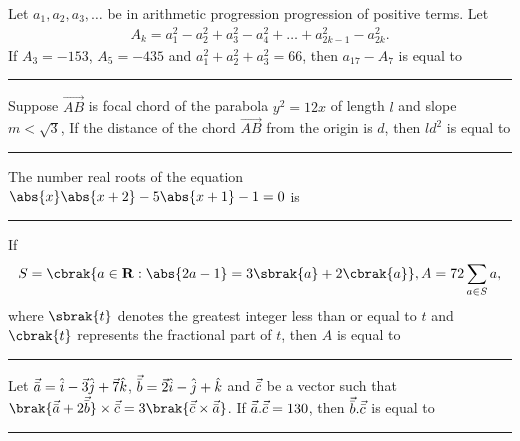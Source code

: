 \iffalse
\title{Assignment-4}
\author{EE24BTECH11049}
\section{integer}
\fi

%
    \item
    Let $a_1, a_2, a_3, \dots $ be in arithmetic progression progression of positive terms. Let
    \begin{align*}
        A_k = a_1^2 - a_2^2 + a_3^2 - a_4^2 + \dots + a_{2k-1}^2 -a_{2k}^2.
    \end{align*} 
    If $A_3 = -153$, $A_5 = -435$ and $a_1^2 + a_2^2 + a_3^2 = 66$, then $a_{17} - A_7$ is equal to \rule{1cm}{0.1pt}

    \hfill{}

    \item 
    Suppose $\vec{AB}$ is focal chord of the parabola $y^2 = 12x$ of length $l$ and slope $m < \sqrt{3}$, If the distance of the chord $\vec{AB}$ from the origin is $d$, then $ld^2$ is equal to \rule{1cm}{0.1pt}

    \hfill{}

    \item 
    The number real roots of the equation $\abs{x}\abs{x + 2} -  5\abs{x + 1} - 1 = 0$ is \rule{1cm}{0.1pt}

    \hfill{}

    \item 
    If 
    \begin{align*}
        S = \cbrak{a \in \mathbf{R} : \abs{2a - 1} = 3\sbrak{a} + 2\cbrak{a}}, A = 72\sum_{a \in S}a, 
    \end{align*}
    where $\sbrak{t}$ denotes the greatest integer less than or equal to $t$ and $\cbrak{t}$ represents the fractional part of $t$, then $A$ is equal to \rule{1cm}{0.1pt}

    \hfill{}

    \item 
    Let $\vec{\Bar{a}} = \hat{i} - \vec{3}\hat{j} + \vec{7}\hat{k}$, $\vec{\Bar{b}} = \vec{2}\hat{i} - \hat{j} + \hat{k}$ and $\vec{\Bar{c}}$ be a vector such that $\brak{\vec{\Bar{a}} + 2\vec{\Bar{b}}} \times \vec{\Bar{c}} = 3\brak{\vec{\Bar{c}} \times \vec{\Bar{a}}}$. If $\vec{\Bar{a}} . \vec{\Bar{c}} = 130$, then $\vec{\Bar{b}} . \vec{\Bar{c}}$ is equal to \rule{1cm}{0.1pt}

